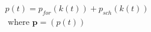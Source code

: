 \begin{equation}
\begin{split}
	p(t) = p_{for}(k(t)) + p_{sch}(k(t))\\
	\text{ where } \textbf{p} = (p(t))
\end{split}
\label{ch2:equ:notation-simplification}
\end{equation}